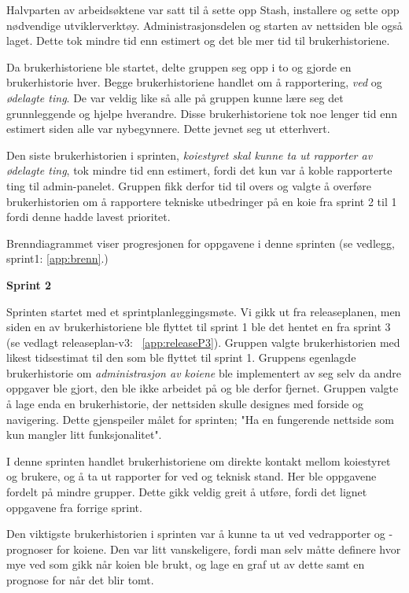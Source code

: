 \documentclass[12pt,a4paper,norsk]{article}
\begin{document}
Halvparten av arbeidsøktene var satt til å sette opp Stash, installere og sette opp nødvendige utviklerverktøy. Administrasjonsdelen og starten av nettsiden ble også laget. Dette tok mindre tid enn estimert og det ble mer tid til brukerhistoriene.

Da brukerhistoriene ble startet, delte gruppen seg opp i to og gjorde en brukerhistorie hver. Begge brukerhistoriene handlet om å rapportering, \textit{ved} og \textit{ødelagte ting}. De var veldig like så alle på gruppen kunne lære seg det grunnleggende og hjelpe hverandre. Disse brukerhistoriene tok noe lenger tid enn estimert siden alle var nybegynnere. Dette jevnet seg ut etterhvert.

Den siste brukerhistorien i sprinten, \textit{koiestyret skal kunne ta ut rapporter av ødelagte ting}, tok mindre tid enn estimert, fordi det kun var å koble rapporterte ting til admin-panelet. Gruppen fikk derfor tid til overs og valgte å overføre brukerhistorien om å rapportere tekniske utbedringer på en koie fra sprint 2 til 1 fordi denne hadde lavest prioritet.

Brenndiagrammet viser progresjonen for oppgavene i denne sprinten (se vedlegg, sprint1: \cref{app:brenn}.)

\bigskip \noindent \textbf{Sprint 2}
\par Sprinten startet med et sprintplanleggingsmøte. Vi gikk ut fra releaseplanen, men siden en av brukerhistoriene ble flyttet til sprint 1 ble det hentet en fra sprint 3 (se vedlagt releaseplan-v3: ~\cref{app:releaseP3}). Gruppen valgte brukerhistorien med likest tidsestimat til den som ble flyttet til sprint 1. Gruppens egenlagde brukerhistorie om \textit{administrasjon av koiene} ble implementert av seg selv da andre oppgaver ble gjort, den ble ikke arbeidet på og ble derfor fjernet. Gruppen valgte å lage enda en brukerhistorie, der nettsiden skulle designes med forside og navigering. Dette gjenspeiler målet for sprinten; "Ha en fungerende nettside som kun mangler litt funksjonalitet".

I denne sprinten handlet brukerhistoriene om direkte kontakt mellom koiestyret og brukere, og å ta ut rapporter for ved og teknisk stand. Her ble oppgavene fordelt på mindre grupper.
Dette gikk veldig greit å utføre, fordi det lignet oppgavene fra forrige sprint.

Den viktigste brukerhistorien i sprinten var å kunne ta ut ved vedrapporter og -prognoser for koiene. Den var litt vanskeligere, fordi man selv måtte definere hvor mye ved som gikk når koien ble brukt, og lage en graf ut av dette samt en prognose for når det blir tomt.
\end{document}
